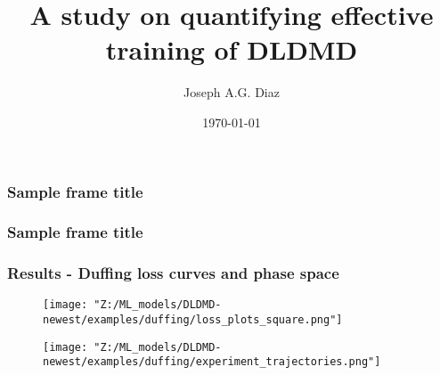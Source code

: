 \documentclass[11pt,aspectratio=169]{beamer}
\title{A study on quantifying effective training of DLDMD}
\author{Joseph A.G. Diaz}
\institute{San Diego State University\\Nonlinear Dynamical Systems}
\date{\today}
\begin{document}
    \frame{\titlepage}

    \begin{frame}
        \frametitle{Sample frame title}

    \end{frame}

    \begin{frame}
        \frametitle{Sample frame title}

    \end{frame}

    \begin{frame}
        \frametitle{Results - Duffing loss curves and phase space}
        \begin{figure}
            \centering
            \begin{minipage}{.5\textwidth}
                \texttt{[image: "Z:/ML\_models/DLDMD-newest/examples/duffing/loss\_plots\_square.png"]}
            \end{minipage}%
            \begin{minipage}{.5\textwidth}
                \texttt{[image: "Z:/ML\_models/DLDMD-newest/examples/duffing/experiment\_trajectories.png"]}
            \end{minipage}
        \end{figure}
    \end{frame}
    
\end{document}
